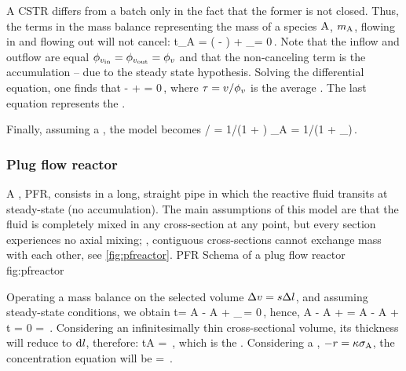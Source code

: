 A CSTR differs from a batch only in the fact that the former is not closed. Thus, the terms in the mass balance representing the mass of a species $\ce A$, $\mass_{\ce A}$, flowing in and flowing out will not cancel:
\beq
\iod t\mass_{\ce A} = \flow\vol\left( - \right) + \int_\vol\rrate\dx\vol = 0\,.
\eeq
Note that the inflow and outflow are equal $\phi_{v_\text{in}} = \phi_{v_\text{out}} = \phi_{v}$ and that the non-canceling term is the accumulation -- due to the steady state hypothesis. Solving the differential equation, one finds that
\beq
{} -  + \rtime\rrate = 0\,,
\eeq
where $\tau = v/\phi_{v}$ is the average . The last equation represents the . 

Finally, assuming a , the model becomes
\beq
{}/ = 1/\left(1 + \krcoeff\rtime\right)\implies
\kdim_{\conc A} = 1/\left(1 + \kdim_\rtime\right)\,.
\eeq


\subsubsection{Plug flow reactor}
A , PFR, consists in a long, straight pipe in which the reactive fluid transits at steady-state (no accumulation). The main assumptions of this model are that the fluid is completely mixed in any cross-section at any point, but every section experiences no axial mixing; \ie, contiguous cross-sections cannot exchange mass with each other, see \cref{fig:pfreactor}.
%
   {PFR}
   {Schema of a plug flow reactor}%
   {fig:pfreactor}%

Operating a mass balance on the selected volume $\Delta v = s\Delta l$, and assuming steady-state conditions, we obtain
\beq
\iod t\mass = \flow\vol\conc A - \flow\vol\conc A + \int_{\Dx\vol}\rrate\,\dx\vol = 0\,,
\eeq
hence,
\beq
\flow\vol\conc A - \flow\vol\conc A + \rrate\Dx\vol = 
\flow\vol\conc A - \flow\vol\conc A + \rrate\flow\vol\Dx t = 0
\implies
{} = \rrate\,.
\eeq
Considering an infinitesimally thin cross-sectional volume, its thickness will reduce to $\text{d}l$, therefore:
\beq
\iod t\conc A = \rrate\,,
\eeq
which is the . Considering a , $-\rrate = \krcoeff\conc A$, the concentration equation will be
\beq
{} = \exp{}\,.
\eeq


